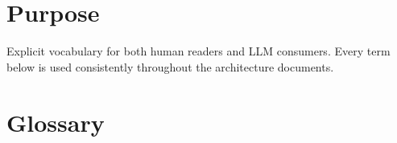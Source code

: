 




\makespecheader

\section{Purpose}
Explicit vocabulary for both human readers and LLM consumers. Every term below is used consistently throughout the architecture documents.

\section{Glossary}

